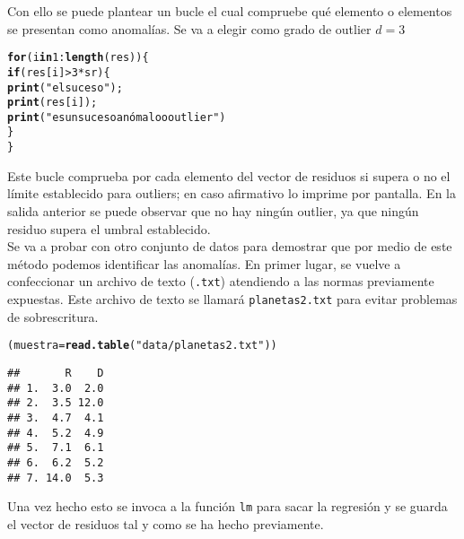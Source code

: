 \documentclass[12pt]{report}\usepackage[]{graphicx}\usepackage[dvipsnames]{xcolor}
\makeatletter
\newcommand{\hlnum}[1]{\textcolor[rgb]{0.686,0.059,0.569}{#1}}%
\newcommand{\hlstr}[1]{\textcolor[rgb]{0.192,0.494,0.8}{#1}}%
\newcommand{\hlopt}[1]{\textcolor[rgb]{0,0,0}{#1}}%
\newcommand{\hlstd}[1]{\textcolor[rgb]{0.345,0.345,0.345}{#1}}%
\newcommand{\hlkwa}[1]{\textcolor[rgb]{0.161,0.373,0.58}{\textbf{#1}}}%
\newcommand{\hlkwb}[1]{\textcolor[rgb]{0.69,0.353,0.396}{#1}}%
\newcommand{\hlkwd}[1]{\textcolor[rgb]{0.737,0.353,0.396}{\textbf{#1}}}%
\newenvironment{kframe}{%
 \def\at@end@of@kframe{}%
 \ifinner\ifhmode%
  \def\at@end@of@kframe{\end{minipage}}%
  \begin{minipage}{\columnwidth}%
 \fi\fi%
 \def\FrameCommand##1{\hskip\@totalleftmargin \hskip-\fboxsep
 \colorbox{shadecolor}{##1}\hskip-\fboxsep
     \hskip-\linewidth \hskip-\@totalleftmargin \hskip\columnwidth}%
 \MakeFramed {\advance\hsize-\width
   \@totalleftmargin\z@ \linewidth\hsize
   \@setminipage}}%
 {\par\unskip\endMakeFramed%
 \at@end@of@kframe}
\newenvironment{knitrout}{}{} %
\makeatother
\begin{document}
	 Con ello se puede plantear un bucle el cual compruebe qué elemento o elementos se presentan como anomalías. Se va a elegir como grado de outlier $d = 3$
	 
\begin{knitrout}
\color{fgcolor}\begin{kframe}
\begin{alltt}
\hlkwa{for} \hlstd{(i} \hlkwa{in} \hlnum{1}\hlopt{:}\hlkwd{length}\hlstd{(res))\{}
                 \hlkwa{if}\hlstd{(res[i]}\hlopt{>}\hlnum{3}\hlopt{*}\hlstd{sr)\{}
                        \hlkwd{print}\hlstd{(}\hlstr{"el suceso"}\hlstd{);}
                        \hlkwd{print}\hlstd{(res[i]);}
                        \hlkwd{print}\hlstd{(}\hlstr{"es un suceso anómalo o outlier"}\hlstd{)}
                 \hlstd{\}}
\hlstd{\}}
\end{alltt}
\end{kframe}
\end{knitrout}
	 
	 Este bucle comprueba por cada elemento del vector de residuos si supera o no el límite establecido para outliers; en caso afirmativo lo imprime por pantalla. En la salida anterior se puede observar que no hay ningún outlier, ya que ningún residuo supera el umbral establecido.\\ 
	 
	 Se va a probar con otro conjunto de datos para demostrar que por medio de este método podemos identificar las anomalías. En primer lugar, se vuelve a confeccionar un archivo de texto (\texttt{.txt}) atendiendo a las normas previamente expuestas. Este archivo de texto se llamará \texttt{planetas2.txt} para evitar problemas de sobrescritura. 
	
\begin{knitrout}
\color{fgcolor}\begin{kframe}
\begin{alltt}
\hlstd{(muestra} \hlkwb{=} \hlkwd{read.table}\hlstd{(}\hlstr{"data/planetas2.txt"}\hlstd{))}
\end{alltt}
\begin{verbatim}
##       R    D
## 1.  3.0  2.0
## 2.  3.5 12.0
## 3.  4.7  4.1
## 4.  5.2  4.9
## 5.  7.1  6.1
## 6.  6.2  5.2
## 7. 14.0  5.3
\end{verbatim}
\end{kframe}
\end{knitrout}
	 
	 Una vez hecho esto se invoca a la función \texttt{lm} para sacar la regresión y se guarda el vector de residuos tal y como se ha hecho previamente.
	 
\end{document}

